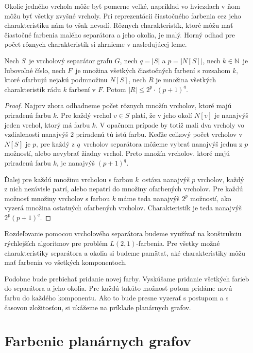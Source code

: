 Okolie jedného vrchola môže byť pomerne veľké, napríklad vo hviezdach v ňom môžu byť všetky zvyšné vrcholy.
Pri reprezentácii čiastočného farbenia cez jeho charakteristiku nám to však nevadí. Rôznych charakteristík,
ktoré môžu mať čiastočné farbenia malého separátora a jeho okolia, je malý. Horný odhad pre počet rôznych
charakteristík si zhrnieme v nasledujúcej leme.

\begin{lema}
    Nech $S$ je vrcholový separátor grafu $G$, nech $q = |S|$ a $p = |N[S]|$, nech $k \in \mathbb{N}$ je ľubovoľné
    číslo, nech $F$ je množina všetkých čiastočných farbení s rozsahom $k$, ktoré ofarbujú nejakú podmnožinu $N[S]$,
    nech $R$ je množina všetkých charakteristík rádu $k$ farbení v $F$. Potom $|R| \leq 2^p \cdot (p+1)^{q}$.
\end{lema}
\begin{proof}
    Najprv zhora odhadneme počet rôznych množín vrcholov, ktoré majú priradenú farbu $k$. Pre každý vrchol
    $v \in S$ platí, že v jeho okolí $N[v]$ je nanajvýš jeden vrchol, ktorý má farbu $k$. V opačnom prípade by totiž
    mali dva vrcholy vo vzdialenosti nanajvýš $2$ priradenú tú istú farbu. Keďže celkový počet vrcholov
    v $N[S]$ je $p$, pre každý z $q$ vrcholov separátora môžeme vybrať nanajvýš jednu z $p$ možností, alebo
    nevybrať žiadny vrchol. Preto množín vrcholov, ktoré majú priradenú farbu $k$, je nanajvýš $(p+1)^q$.

    Ďalej pre každú množinu vrcholou s farbou $k$ ostáva nanajvýš $p$ vrcholov, každý z nich nezávisle
    patrí, alebo nepatrí do množiny ofarbených vrcholov. Pre každú možnosť množiny vrcholov s farbou $k$
    máme teda nanajvýš $2^p$ možností, ako vyzerá množina ostatných ofarbených vrcholov. Charakteristík
    je teda nanajvýš $2^p (p+1)^q$.
\end{proof}

Rozdeľovanie pomocou vrcholového separátora budeme využívať na konštrukciu rýchlejších algoritmov
pre problém $L(2,1)$-farbenia. Pre všetky možné charakteristiky separátora a okolia si budeme pamätať,
aké charakteristiky môžu mať farbenia vo všetkých komponentoch.

Podobne bude prebiehať pridanie novej
farby. Vyskúšame pridanie všetkých farieb do separátora a jeho okolia. Pre každú takúto možnosť potom
pridáme novú farbu do každého komponentu. Ako to bude presne vyzerať s postupom a s časovou zložitosťou,
si ukážeme na príklade planárnych grafov.

\section{Farbenie planárnych grafov}

